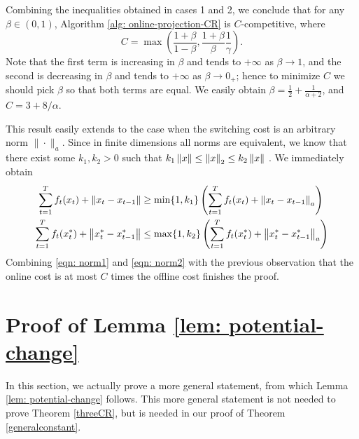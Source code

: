 Combining the inequalities obtained in cases 1 and 2, we conclude that for any $\beta \in (0, 1)$, Algorithm \ref{alg: online-projection-CR} is $C$-competitive, where $$C = \max{ \left( \frac{1 +\beta}{1 - \beta}, \frac{1 +\beta}{\beta}\frac{1}{\gamma} \right). }$$ Note that the first term is increasing in $\beta$ and tends to $+\infty$ as $\beta \rightarrow 1$, and the second is decreasing in $\beta$ and tends to $+\infty$ as $\beta \rightarrow 0_+$; hence to minimize $C$ we should pick $\beta$ so that both terms are equal. We easily obtain $\beta = \frac{1}{2} + \frac{1}{\alpha + 2}$, and $C = 3 + 8/\alpha$.




This result easily extends to the case when the switching cost is an arbitrary norm $\| \cdot \|_a$. Since in finite dimensions all norms are equivalent, we know that there exist some $k_1, k_2 > 0$ such that $k_1\left\lVert x \right\rVert \le \left\lVert x \right\rVert_2 \le k_2\left\lVert x \right\rVert$ . We immediately obtain
\begin{align}
\label{eqn: norm1}
\sum_{t=1}^T f_t(x_t) + \left\lVert x_t - x_{t-1} \right\rVert &\ge \min\{1, k_1\} \left(\sum_{t=1}^T f_t(x_t) + \left\lVert x_t - x_{t-1} \right\rVert_a\right) \\
\label{eqn: norm2}
\sum_{t=1}^T f_t(x_t^*) + \left\lVert x_t^* - x_{t-1}^* \right\rVert &\le \max\{1, k_2\} \left(\sum_{t=1}^T f_t(x_t^*) + \left\lVert x_t^* - x_{t-1}^* \right\rVert_a\right) 
\end{align}
Combining \eqref{eqn: norm1} and \eqref{eqn: norm2} with the previous observation that the online cost is at most $C$ times the offline cost finishes the proof.


\section{Proof of Lemma \ref{lem: potential-change}}
In this section, we actually prove a more general statement, from which Lemma \ref{lem: potential-change} follows.  This more general statement is not needed to prove Theorem \ref{threeCR}, but is needed in our proof of Theorem \ref{generalconstant}. 


